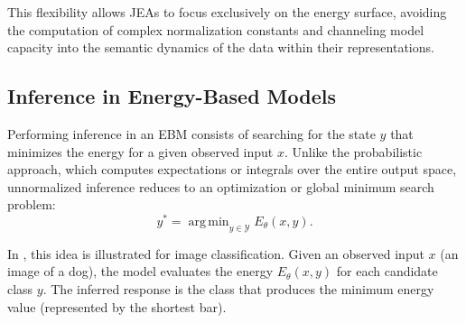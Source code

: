 \documentclass[11pt, oneside, openany]{book}
\DeclareMathOperator*{\argmin}{arg\,min}
\begin{document}
This flexibility allows JEAs to focus exclusively on the energy surface, avoiding the computation of complex normalization constants and channeling model capacity into the semantic dynamics of the data within their representations.

\subsection{Inference in Energy-Based Models}
\label{sec:2.1.2}

Performing inference in an EBM consists of searching for the state $y$ that minimizes the energy for a given observed input $x$. Unlike the probabilistic approach, which computes expectations or integrals over the entire output space, unnormalized inference reduces to an optimization or global minimum search problem:
\begin{equation}
\label{eq:2.2}
y^{*} = \argmin_{y \in \mathcal{Y}} E_{\theta}(x,y).
\end{equation}

In , this idea is illustrated for image classification. Given an observed input $x$ (an image of a dog), the model evaluates the energy $E_{\theta}(x,y)$ for each candidate class $y$. The inferred response is the class that produces the minimum energy value (represented by the shortest bar).
\end{document}
